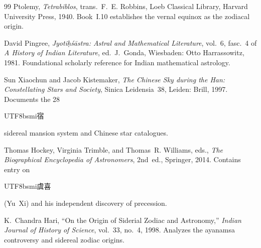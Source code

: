 \documentclass[10pt,a4paper]{article}
\newcommand{\zh}[1]{\begin{CJK}{UTF8}{bsmi}#1\end{CJK}}
\begin{document}
\begin{sloppypar}
\begin{thebibliography}{99}
Ptolemy, \textit{Tetrabiblos}, trans.\ F.~E. Robbins,
Loeb Classical Library, Harvard University Press, 1940.
Book~I.10 establishes the vernal equinox as the zodiacal origin.

David Pingree, \textit{Jyoti\d{h}\'{s}\={a}stra: Astral and
Mathematical Literature}, vol.~6, fasc.~4 of \textit{A History of
Indian Literature}, ed.\ J.~Gonda, Wiesbaden: Otto Harrassowitz,
1981. Foundational scholarly reference for Indian mathematical
astrology.

Sun Xiaochun and Jacob Kistemaker, \textit{The Chinese Sky during
the Han: Constellating Stars and Society}, Sinica Leidensia~38,
Leiden: Brill, 1997. Documents the 28~\zh{宿} sidereal mansion
system and Chinese star catalogues.

Thomas Hockey, Virginia Trimble, and Thomas~R. Williams, eds.,
\textit{The Biographical Encyclopedia of Astronomers}, 2nd~ed.,
Springer, 2014. Contains entry on \zh{虞喜} (Yu~Xi) and his
independent discovery of precession.

K.~Chandra Hari, ``On the Origin of Siderial Zodiac and Astronomy,''
\textit{Indian Journal of History of Science}, vol.~33, no.~4, 1998.
Analyzes the ayanamsa controversy and sidereal zodiac origins.

\end{thebibliography}
\end{sloppypar}
\end{document}
